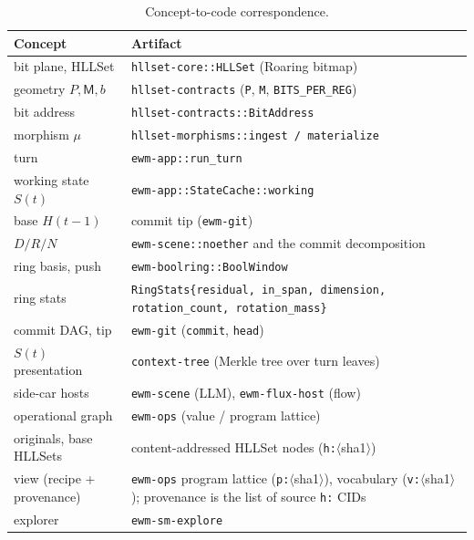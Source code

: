 \documentclass[11pt,a4paper]{article}
\theoremstyle{remark}
\newcommand{\Reg}{\ensuremath{\mathsf{M}}}            %
\newcommand{\Prec}{\ensuremath{P}}                    %
\newcommand{\Bits}{\ensuremath{b}}                    %
\begin{document}
\begin{table}[h]
\centering
\small
\begin{tabular}{@{}p{}p{}@{}}
\toprule
Concept & Artifact \\
\midrule
bit plane, HLLSet & \texttt{hllset-core::HLLSet} (Roaring bitmap) \\
geometry $\Prec,\Reg,\Bits$ & \texttt{hllset-contracts} (\texttt{P}, \texttt{M}, \texttt{BITS\_PER\_REG}) \\
bit address & \texttt{hllset-contracts::BitAddress} \\
morphism $\mu$ & \texttt{hllset-morphisms::ingest / materialize} \\
turn & \texttt{ewm-app::run\_turn} \\
working state $S(t)$ & \texttt{ewm-app::StateCache::working} \\
base $H(t{-}1)$ & commit tip (\texttt{ewm-git}) \\
$D/R/N$ & \texttt{ewm-scene::noether} and the commit decomposition \\
ring basis, push & \texttt{ewm-boolring::BoolWindow} \\
ring stats & \texttt{RingStats\{residual, in\_span, dimension, rotation\_count, rotation\_mass\}} \\
commit DAG, tip & \texttt{ewm-git} (\texttt{commit}, \texttt{head}) \\
$S(t)$ presentation & \texttt{context-tree} (Merkle tree over turn leaves) \\
side-car hosts & \texttt{ewm-scene} (LLM), \texttt{ewm-flux-host} (flow) \\
operational graph & \texttt{ewm-ops} (value / program lattice) \\
originals, base HLLSets & content-addressed HLLSet nodes (\texttt{h:}$\langle$sha1$\rangle$) \\
view (recipe + provenance) & \texttt{ewm-ops} program lattice (\texttt{p:}$\langle$sha1$\rangle$), vocabulary (\texttt{v:}$\langle$sha1$\rangle$); provenance is the list of source \texttt{h:} CIDs \\
explorer & \texttt{ewm-sm-explore} \\
\bottomrule
\end{tabular}
\caption{Concept-to-code correspondence.}
\label{tab:impl}
\end{table}
\end{document}
